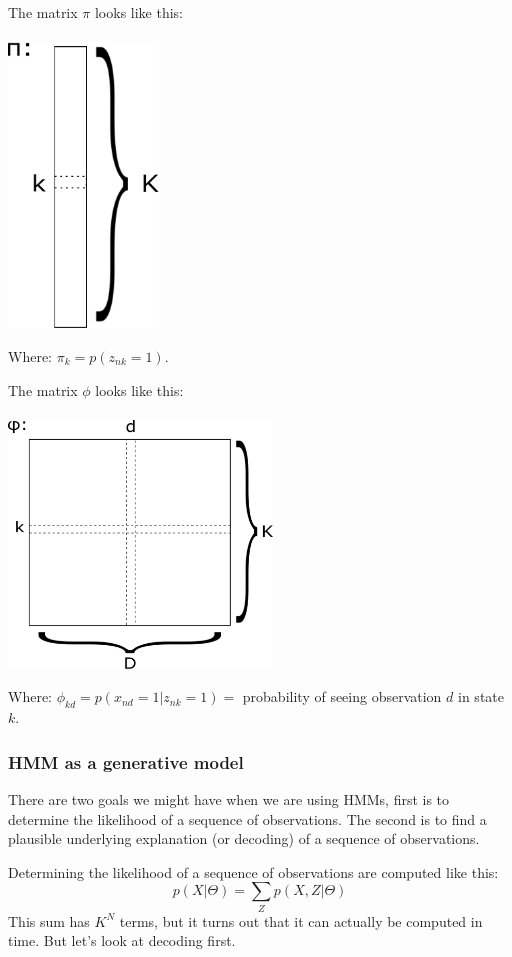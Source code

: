     The matrix $\pi$ looks like this:\\
    \\
    \includegraphics[width=4cm]{Figures/init_prob_PI.pdf}
    
    Where: $\pi_k=p(z_{nk}=1)$.
    
    The matrix $\phi$ looks like this:\\
    \\
    \includegraphics[width=7cm]{Figures/emis_prob_PHI.pdf}
    
    Where: $\phi_{kd}=p(x_{nd}=1|z_{nk}=1)=$ probability of seeing observation 
    $d$ in state $k$.
    
    \subsubsection{HMM as a generative model}
    There are two goals we might have when we are using HMMs, first is to 
    determine the likelihood of a sequence of observations. The second is to 
    find a plausible underlying explanation (or decoding) of a sequence of 
    observations.
    
    Determining the likelihood of a sequence of observations are computed like 
    this:
    \begin{equation*}
        p(X|\Theta) = \sum_Z p(X,Z|\Theta)
    \end{equation*}
    This sum has $K^N$ terms, but it turns out that it can actually be computed 
    in  time. But let's look at decoding first.
    
